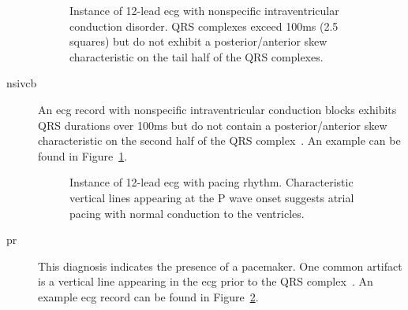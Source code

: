 \documentclass[\main/thesis.tex]{subfiles}
\begin{document}
\begin{description}
    \begin{figure}[ht]
        \centering
        \caption{Instance of 12-lead \gls{ecg} with nonspecific intraventricular conduction disorder. QRS complexes exceed 100ms (2.5 squares) but do not exhibit a posterior/anterior skew characteristic on the tail half of the QRS complexes.}
        \label{fig:full_NSIVCB}
    \end{figure}
    \item[\gls{nsivcb}] An \gls{ecg} record with nonspecific intraventricular conduction blocks exhibits QRS durations over 100ms but do not contain a posterior/anterior skew characteristic on the second half of the QRS complex~\cite{ecg-utah-lesson}.
    An example can be found in Figure~\ref{fig:full_NSIVCB}.

    \begin{figure}[ht]
        \centering
        \caption{Instance of 12-lead \gls{ecg} with pacing rhythm. Characteristic vertical lines appearing at the P wave onset suggests atrial pacing with normal conduction to the ventricles.}
        \label{fig:full_PR}
    \end{figure}
    \item[\gls{pr}] This diagnosis indicates the presence of a pacemaker. One common artifact is a vertical line appearing in the \gls{ecg} prior to the QRS complex~\cite{kirk_basic_2007}.
    An example \gls{ecg} record can be found in Figure~\ref{fig:full_PR}.


\end{description}
\end{document}
